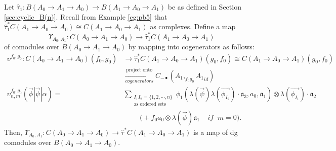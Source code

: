 \begin{prop}
\label{prop:c1}
Let $\hat{\tau}_1: 
B(A_0 \to A_1 \to A_0) 
\longrightarrow B(A_1 \to A_0 \to A_1)$ 
be as defined in Section 
\ref{sec:cyclic_B(n)}.
Recall from Example \ref{eg:pb5} that 
$\hat{\tau}_1^*C(A_1 \to A_0 \to A_0)
\cong C(A_1 \to A_0 \to A_1)$ 
as complexes. Define a map 
$$
\Upsilon_{A_0,A_1}: C(A_0 \to A_1 \to A_0)
\to \hat{\tau}_1^*C(A_1 \to A_0 \to A_1)
$$
of comodules over 
$B(A_0 \to A_1 \to A_0)$ by mapping into 
cogenerators as follows:
\begin{align*}
\upsilon^{f_0, g_0}: C(A_0 \to A_1 \to A_0)(f_0,g_0) 
&\to
\hat{\tau}_1^*C(A_1 \to A_0 \to A_1)(g_0,f_0)
\cong 
C(A_1 \to A_0 \to A_1)(g_0,f_0)\\
&\xrightarrow[cogenerators]{\textrm{project onto}}
C_{-\bullet}(A_1, _{f_0g_0}{A_1}_{id})\\
\upsilon_{n,m}^{f_0,g_0} 
(\vec{\phi} | \vec{\psi} | \alpha) = 
& \sum_{\substack{I_1I_2 = \{1,2,\cdots,n\} \\
                          \textrm{as ordered sets}}}
  \phi_1(\lambda(\vec{\psi})\lambda(\vec{\phi_{I_2}})\cdot \mathfrak{a}_3, a_0, \mathfrak{a}_1) \otimes \lambda(\vec{\phi_{I_1}}) \cdot \mathfrak{a}_2 \\
&\phantom{{}move{}}
\bigg( + f_0a_0 \otimes \lambda(\vec{\phi}) \mathfrak{a}_1 
  \; \; \; \; if \; \; m = 0 \bigg).
\end{align*}
Then, $\Upsilon_{A_0,A_1}: C(A_0 \to A_1 \to A_0)
\to \hat{\tau}^*C(A_1 \to A_0 \to A_1)$ 
is a map of dg comodules over 
$B(A_0 \to A_1 \to A_0)$.
\end{prop}
%
